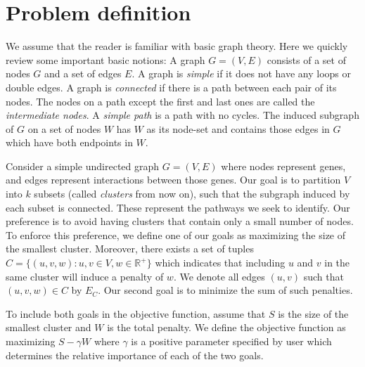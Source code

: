 \documentclass[conference]{IEEEtran}
\newcommand{\NDB}[1]{\todo[bordercolor=mhue,linecolor=mhue,color=mhue!40]{Behrouz: #1}}
\begin{document}
\section{Problem definition}
\label{sec:definition}

We assume that the reader is familiar with basic graph theory. Here we quickly review some important basic notions: A graph $G=(V, E)$ consists of a set of nodes $G$ and a set of edges $E$. A graph is \emph{simple} if it does not have any loops or double edges. A graph is \emph{connected} if there is a path between each pair of its nodes. The nodes on a path except the first and last ones are called the \emph{intermediate nodes}. A \emph{simple path} is a path with no cycles. The induced subgraph of $G$ on a set of nodes $W$ has $W$ as its node-set and contains those edges in $G$ which have both endpoints in $W$. 




Consider a simple undirected graph $G=(V, E)$ where nodes represent genes, and edges represent interactions between those genes. Our goal is to partition $V$
into $k$ subsets (called \emph{clusters} from now on), such that the
subgraph induced by each subset is connected. These represent the pathways we seek to identify. Our preference is to avoid
having clusters that contain only a small number of nodes. To enforce
this preference, we define one of our goals as maximizing the size of
the smallest cluster. Moreover, there exists a set of tuples
$C = \{(u, v, w): u, v \in V, w \in \mathbb{R}^+\}$ which indicates that
including $u$ and $v$ in the same cluster will induce a penalty of $w$. We denote all edges $(u, v)$ such that $(u, v, w) \in C$ by $E_C$. Our second goal is to minimize the sum of such penalties.


To include both goals in the objective function, assume that $S$ is the
size of the smallest cluster and $W$ is the total penalty. We define the
objective function as maximizing $S - \gamma W$ where $\gamma$ is a
positive parameter specified by user which determines the relative importance of each of the two goals.
\NDB{Mention normalization}
\end{document}
